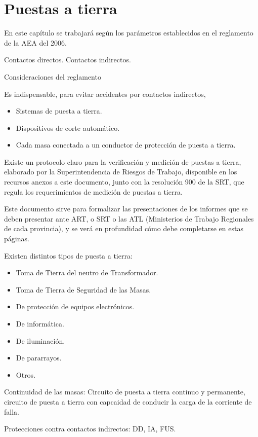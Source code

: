 
\chapter{Puestas a tierra}

En este capítulo se trabajará según los parámetros establecidos en el reglamento de la AEA del 2006.

Contactos directos.
Contactos indirectos.

Consideraciones del reglamento

Es indispensable, para evitar accidentes por contactos indirectos,
\begin{itemize}
	\item Sistemas de puesta a tierra.
	\item Dispositivos de corte automático.
	\item Cada masa conectada a un conductor de protección de puesta a tierra.
\end{itemize}

Existe un protocolo claro para la verificación y medición de puestas a tierra, elaborado por la Superintendencia de Riesgos de Trabajo, disponible en los recursos anexos a este documento, junto con la resolución 900 de la SRT, que regula los requerimientos de medición de puestas a tierra.

Este documento sirve para formalizar las presentaciones de los informes que se deben presentar ante ART, o SRT o las ATL (Ministerios de Trabajo Regionales de cada provincia), y se verá en profundidad cómo debe completarse en estas páginas.

Existen distintos tipos de puesta a tierra:
\begin{itemize}
	\item Toma de Tierra del neutro de Transformador.
	\item Toma de Tierra de Seguridad de las Masas.
	\item De protección de equipos electrónicos.
	\item De informática.
	\item De iluminación.
	\item De pararrayos.
	\item Otros.
\end{itemize}

Continuidad de las masas: Circuito de puesta a tierra continuo y permanente, circuito de puesta a tierra con capcaidad de conducir la carga de la corriente de falla.

Protecciones contra contactos indirectos: DD, IA, FUS.

